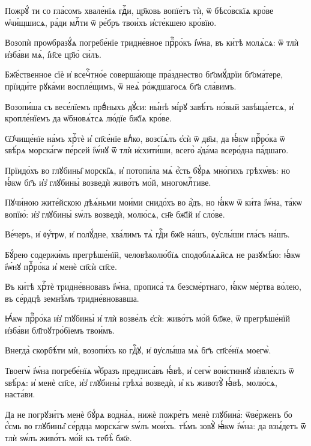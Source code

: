 \hKv Пожрꙋ́ ти со гла́сомъ хвале́нїѧ гдⷭ҇и, цр҃ковь вопїе́тъ тѝ,  ѿ бѣсо́вскїѧ кро́ве ѡ҆чи́щшисѧ, ра́ди млⷭ҇ти ѿ ре́бръ  твои́хъ и҆сте́кшею кро́вїю. 
%

\hKv Возопѝ проѡбразꙋ́ѧ погребе́нїе  тридне́вное прⷪ҇ро́къ і҆ѡ́на, въ ки́тѣ молѧ́сѧ: ѿ тлѝ  и҆зба́ви мѧ̀, і҆и҃се цр҃ю̀ си́лъ. 
%

\hKv Бж҃е́ственное сїѐ и҆ всечⷭ҇тно́е соверша́юще пра́зднество  бг҃омꙋ́дрїи бг҃ома́тере, прїиди́те   рꙋка́ми воспле́щимъ, ѿ неѧ̀ ро́ждшагосѧ бг҃а сла́вимъ. 
%

\hKv Возопи́ша съ весе́лїемъ првⷣныхъ  дꙋ́си: ны́нѣ мі́рꙋ завѣ́тъ но́вый завѣща́етсѧ, и҆  кропле́нїемъ да ѡ҆бновѧ́тсѧ лю́дїе бж҃їѧ кро́ве. 
%

\hKv Ѡ҆чище́нїе на́мъ хрⷭ҇тѐ и҆ сп҃се́нїе  влⷣко, возсїѧ́лъ є҆сѝ ѿ дв҃ы, да ꙗ҆́кѡ прⷪ҇ро́ка ѿ  ѕвѣ́рѧ морска́гѡ пе́рсей і҆ѡ́нꙋ ѿ тлѝ и҆схити́ши, всего̀  а҆да́ма всеро́дна па́дшаго. 
%

\hKv Прїидо́хъ во глꙋбины̑ морскі̑ѧ, и҆ потопи́ла мѧ̀ є҆́сть  бꙋ́рѧ мно́гихъ грѣхѡ́въ: но ꙗ҆́кѡ бг҃ъ и҆з̾ глꙋбины̀  возведѝ живо́тъ мо́й, многомлⷭ҇тиве. 

\hKv Пꙋчи́ною жите́йскою дѣѧ́ньми мои́ми снидо́хъ во а҆́дъ, но  ꙗ҆́кѡ ѿ ки́та і҆ѡ́на, та́кѡ вопїю̀: и҆з̾ глꙋбины̀ ѕѡ́лъ  возведѝ, молю́сѧ, сн҃е бж҃їй и҆ сло́ве.  

\hKv Ве́черъ, и҆ ᲂу҆́трѡ, и҆ полꙋ́дне, хва́лимъ тѧ̀ гдⷭ҇и бж҃е  на́шъ, ᲂу҆слы́ши гла́съ на́шъ. 

\hKv Бꙋ́рею содержи́мь прегрѣше́нїй, человѣколю́бїѧ  сподоблѧ́ѧйсѧ не разꙋмѣ́ю: ꙗ҆́кѡ і҆ѡ́нꙋ прⷪ҇ро́ка и҆ менѐ  сп҃сѝ сп҃се. 

\hKv Въ ки́тѣ хрⷭ҇тѐ тридне́вновавъ і҆ѡ́на, прописа́ тѧ  безсме́ртнаго, ꙗ҆́кѡ ме́ртва во́лею, въ се́рдцѣ земнѣ́мъ  тридне́вновавша. 

\hKv Ꙗ҆́кѡ прⷪ҇ро́ка и҆з̾ глꙋбины̀ и҆ тлѝ возве́лъ є҆сѝ:  живо́тъ мо́й бл҃же, ѿ прегрѣше́нїй и҆зба́ви  бл҃гоꙋтро́бїемъ твои́мъ. 
%

\hKv Внегда̀ скорбѣ́ти мѝ, возопи́хъ ко  гдⷭ҇ꙋ, и҆ ᲂу҆слы́ша мѧ̀ бг҃ъ сп҃се́нїѧ моегѡ̀. 

\hKv Твоегѡ̀ і҆ѡ́на погребе́нїѧ ѡ҆́бразъ предписа́въ ꙗ҆́вѣ, и҆  сегѡ̀ вои́стиннꙋ и҆звле́клъ ѿ ѕвѣ́рѧ: и҆ менѐ сп҃се,  и҆з̾ глꙋбины̀ грѣха̀ возведѝ, и҆ къ животꙋ̀ ꙗ҆́вѣ,  молю́сѧ, наста́ви. 

\hKv Да не погрꙋзи́тъ менѐ бꙋ́рѧ водна́ѧ, нижѐ пожре́тъ менѐ  глꙋбина̀: ѿве́рженъ бо є҆́смь  во  глꙋбины̑ се́рдца морска́гѡ ѕѡ́лъ мои́хъ. тѣ́мъ зовꙋ̀ ꙗ҆́кѡ  і҆ѡ́на: да взы́детъ ѿ тлѝ ѕѡ́лъ живо́тъ мо́й къ тебѣ̀  бж҃е. 

